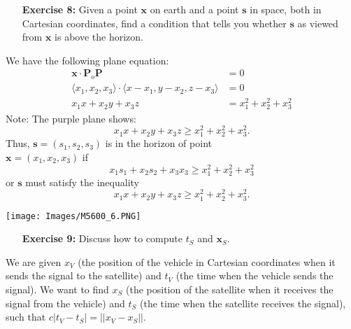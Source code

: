 \documentclass[11pt]{article}
\theoremstyle{definition}
\newcommand{\1}[1]{\mathbf{1} \left \{ #1 \right \}}
\begin{document}
\begin{itemize}
\item[{\textbf{Exercise 8:}}] Given a point $\textbf{x}$ on earth and a point $\textbf{s}$ in space, both in Cartesian coordinates, find a condition that tells you whether $\textbf{s}$ as viewed from $\textbf{x}$ is above the horizon.
\end{itemize}
\begin{minipage}{0.6\linewidth}
We have the following plane equation:
\begin{align*}
    \textbf{x} \cdot \textbf{P}_o\textbf{P} &= 0 \\
    \langle x_1, x_2, x_3 \rangle \cdot \langle x-x_1, y-x_2, z-x_3 \rangle &= 0 \\
    x_1x + x_2y + x_3z &= x_1^2 + x_2^2 + x_3^2
\end{align*}
Note: The purple plane shows:
\[x_1x + x_2y + x_3z \geq x_1^2 + x_2^2 + x_3^2.\]
Thus, $\textbf{s} = (s_1, s_2, s_3)$ is in the horizon of point \\
$\textbf{x} = (x_1, x_2, x_3)$ if
\[x_1s_1 + x_2s_2 + x_3x_3 \geq x_1^2 + x_2^2 + x_3^2\]
or $\textbf{s}$ must satisfy the inequality
\[x_1x + x_2y + x_3z \geq x_1^2 + x_2^2 + x_3^2.\]
\end{minipage}
\begin{minipage}{0.4\linewidth}
\texttt{[image: Images/M5600\_6.PNG]}
\end{minipage}

\begin{itemize}
\item[{\textbf{Exercise 9:}}] Discuss how to compute $t_S$ and $\textbf{x}_S$.
\end{itemize}
We are given $x_V$ (the position of the vehicle in Cartesian coordinates when it sends the signal to the satellite) and $t_V$ (the time when the vehicle sends the signal).  We want to find $x_S$ (the position of the satellite when it receives the signal from the vehicle) and $t_S$ (the time when the satellite receives the signal), such that \(c|t_V - t_S| = ||x_V - x_S||\).
\end{document}
